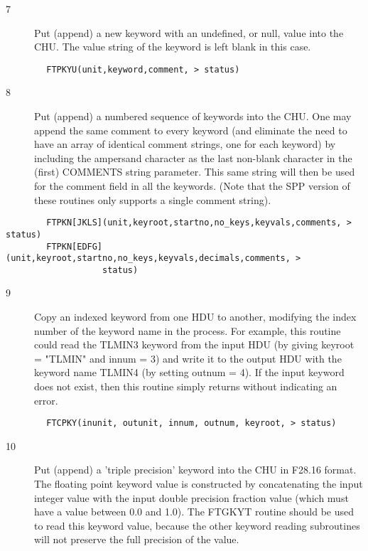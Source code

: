 \documentclass[11pt]{book}
\begin{document}
\begin{description}
\item[7 ] Put (append) a new keyword with an undefined, or null, value into the CHU.
   The value string of the keyword is left blank in this case.
\end{description}

\begin{verbatim}
        FTPKYU(unit,keyword,comment, > status)
\end{verbatim}

\begin{description}
\item[8 ] Put (append) a numbered sequence of keywords into the CHU.   One may
    append the same comment to every keyword (and eliminate the need
    to have an array of identical comment strings, one for each keyword) by
    including the ampersand character as the last non-blank character in the
    (first) COMMENTS string parameter.  This same string
    will then be used for the comment field in all the keywords. (Note
    that the SPP version of these routines only supports a single comment
   string).
\end{description}

\begin{verbatim}
        FTPKN[JKLS](unit,keyroot,startno,no_keys,keyvals,comments, > status)
        FTPKN[EDFG](unit,keyroot,startno,no_keys,keyvals,decimals,comments, >
                   status)
\end{verbatim}

\begin{description}
\item[9 ]Copy an indexed keyword from one HDU to another, modifying
    the index number of the keyword name in the process.  For example,
    this routine could read the TLMIN3 keyword from the input HDU
    (by giving keyroot = "TLMIN" and innum = 3) and write it to the
    output HDU with the keyword name TLMIN4 (by setting outnum = 4).
    If the input keyword does not exist, then this routine simply
   returns without indicating an error.
\end{description}

\begin{verbatim}
        FTCPKY(inunit, outunit, innum, outnum, keyroot, > status)
\end{verbatim}

\begin{description}
\item[10] Put (append) a 'triple precision' keyword into the CHU in F28.16 format.
    The floating point keyword value is constructed by concatenating the
    input integer value with the input double precision fraction value
    (which must have a value between 0.0 and 1.0). The FTGKYT routine should
    be used to read this keyword value, because the other keyword reading
   subroutines will not preserve the full precision of the value.
\end{description}
\end{document}
